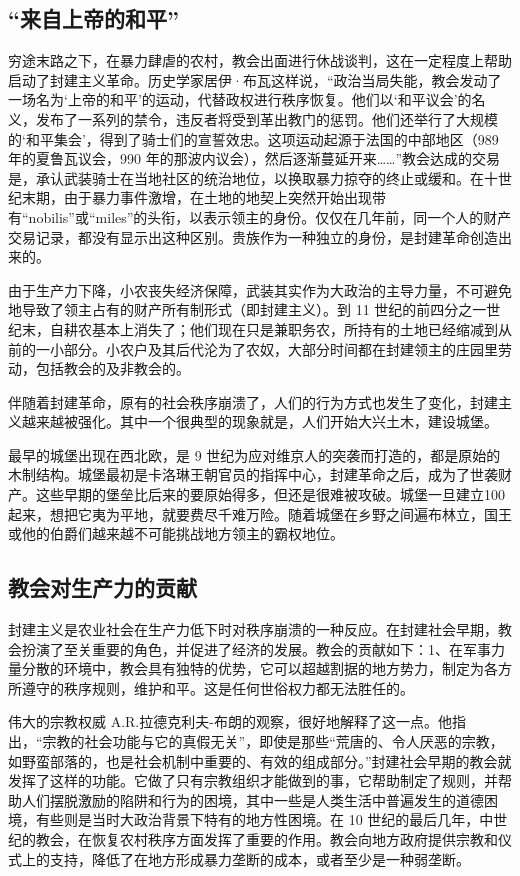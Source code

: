 \subsection{“来自上帝的和平”}
穷途末路之下，在暴力肆虐的农村，教会出面进行休战谈判，这在一定程度上帮助启动了封建主义革命。历史学家居伊·布瓦这样说，“政治当局失能，教会发动了一场名为‘上帝的和平’的运动，代替政权进行秩序恢复。他们以‘和平议会’的名义，发布了一系列的禁令，违反者将受到革出教门的惩罚。他们还举行了大规模的‘和平集会’，得到了骑士们的宣誓效忠。这项运动起源于法国的中部地区（989 年的夏鲁瓦议会，990 年的那波内议会），然后逐渐蔓延开来……”教会达成的交易是，承认武装骑士在当地社区的统治地位，以换取暴力掠夺的终止或缓和。在十世纪末期，由于暴力事件激增，在土地的地契上突然开始出现带有“nobilis”或“miles”的头衔，以表示领主的身份。仅仅在几年前，同一个人的财产交易记录，都没有显示出这种区别。贵族作为一种独立的身份，是封建革命创造出来的。

由于生产力下降，小农丧失经济保障，武装其实作为大政治的主导力量，不可避免地导致了领主占有的财产所有制形式（即封建主义）。到 11 世纪的前四分之一世纪末，自耕农基本上消失了；他们现在只是兼职务农，所持有的土地已经缩减到从前的一小部分。小农户及其后代沦为了农奴，大部分时间都在封建领主的庄园里劳动，包括教会的及非教会的。

伴随着封建革命，原有的社会秩序崩溃了，人们的行为方式也发生了变化，封建主义越来越被强化。其中一个很典型的现象就是，人们开始大兴土木，建设城堡。

最早的城堡出现在西北欧，是 9 世纪为应对维京人的突袭而打造的，都是原始的木制结构。城堡最初是卡洛琳王朝官员的指挥中心，封建革命之后，成为了世袭财产。这些早期的堡垒比后来的要原始得多，但还是很难被攻破。城堡一旦建立100起来，想把它夷为平地，就要费尽千难万险。随着城堡在乡野之间遍布林立，国王或他的伯爵们越来越不可能挑战地方领主的霸权地位。

\subsection{教会对生产力的贡献}
封建主义是农业社会在生产力低下时对秩序崩溃的一种反应。在封建社会早期，教会扮演了至关重要的角色，并促进了经济的发展。教会的贡献如下：1、在军事力量分散的环境中，教会具有独特的优势，它可以超越割据的地方势力，制定为各方所遵守的秩序规则，维护和平。这是任何世俗权力都无法胜任的。

伟大的宗教权威 A.R.拉德克利夫-布朗的观察，很好地解释了这一点。他指出，“宗教的社会功能与它的真假无关”，即使是那些“荒唐的、令人厌恶的宗教，如野蛮部落的，也是社会机制中重要的、有效的组成部分。”封建社会早期的教会就发挥了这样的功能。它做了只有宗教组织才能做到的事，它帮助制定了规则，并帮助人们摆脱激励的陷阱和行为的困境，其中一些是人类生活中普遍发生的道德困境，有些则是当时大政治背景下特有的地方性困境。在 10 世纪的最后几年，中世纪的教会，在恢复农村秩序方面发挥了重要的作用。教会向地方政府提供宗教和仪式上的支持，降低了在地方形成暴力垄断的成本，或者至少是一种弱垄断。

